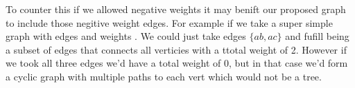 \documentclass{article}
\begin{document}
\begin{enumerate}
    To counter this if we allowed negative weights it may benift our proposed graph to include those negitive weight edges. For example if we take a super simple graph with edges  and weights .
    We could just take edges $\{ab, ac\}$ and fufill being a subset of edges that connects all verticies with a ttotal weight of 2. However if we took all three edges we'd have a total weight of 0, but in that case we'd form a cyclic graph with multiple paths to each vert which would not be a tree.

  \end{enumerate} %
\end{document}

